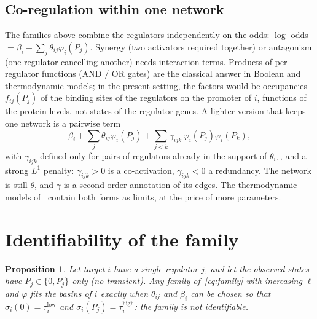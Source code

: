 \documentclass[a4paper, 11pt]{article}
\theoremstyle{plain}
\newtheorem{prop}{Proposition}
\theoremstyle{remark}
\begin{document}
\subsection{Co-regulation within one network}\label{sec:coreg}

The families above combine the regulators independently on the odds: $\log$-odds $= \beta_i + \sum_j \theta_{ij}\varphi_i(P_j)$. Synergy (two activators required together) or antagonism (one regulator cancelling another) needs interaction terms. Products of per-regulator functions (AND / OR gates) are the classical answer in Boolean and thermodynamic models; in the present setting, the factors would be occupancies $f_{ij}(P_j)$ of the binding sites of the regulators on the promoter of $i$, functions of the protein levels, not states of the regulator genes. A lighter version that keeps one network is a pairwise term
\[
\beta_i + \sum_j \theta_{ij}\varphi_i(P_j) + \sum_{j<k}\gamma_{ijk}\,\varphi_i(P_j)\varphi_i(P_k),
\]
with $\gamma_{ijk}$ defined only for pairs of regulators already in the support of $\theta_{i\cdot}$, and a strong $L^1$ penalty: $\gamma_{ijk} > 0$ is a co-activation, $\gamma_{ijk} < 0$ a redundancy. The network is still $\theta$, and $\gamma$ is a second-order annotation of its edges. The thermodynamic models of~\cite{shea1985lambda, bintu2005transcriptional} contain both forms as limits, at the price of more parameters.

\section{Identifiability of the family}\label{sec:identifiability}

\begin{prop}\label{prop:steady}
Let target $i$ have a single regulator $j$, and let the observed states have $P_j \in \{0, \bar P_j\}$ only (no transient). Any family of~\eqref{eq:family} with increasing $\ell$ and $\varphi$ fits the basins of $i$ exactly when $\theta_{ij}$ and $\beta_i$ can be chosen so that $\sigma_i(0) = \tau_i^{\mathrm{low}}$ and $\sigma_i(\bar P_j) = \tau_i^{\mathrm{high}}$: the family is not identifiable.
\end{prop}
\end{document}

